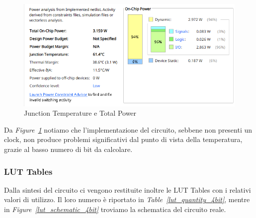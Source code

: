 \begin{figure}[ht]
      \centering
      \includegraphics[width=1\textwidth]{assets/simulations/Post_Implementation/4bit/power.png}
      \caption{Junction Temperature e Total Power}
      \label{4bit_power}
\end{figure}

Da \textit{Figure~\ref{4bit_power}} notiamo che l'implementazione del circuito, sebbene non presenti un clock, non produce problemi significativi dal punto di vista della temperatura, grazie al basso numero di bit da calcolare.
\FloatBarrier

\subsubsection{LUT Tables}

Dalla sintesi del circuito ci vengono restituite inoltre le LUT Tables con i relativi valori di utilizzo. Il loro numero è riportato in \textit{Table~\ref{lut_quantity_4bit}}, mentre in \textit{Figure~\ref{lut_schematic_4bit}}
troviamo la schematica del circuito reale.

